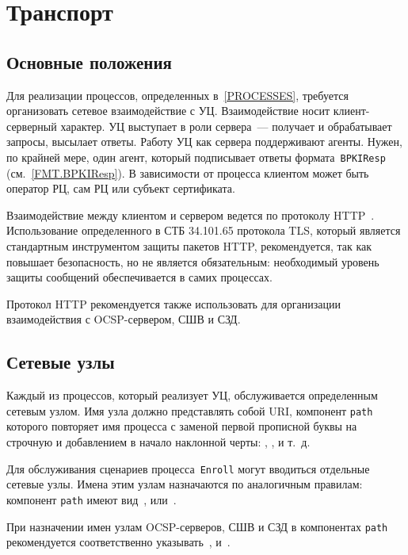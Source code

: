 \chapter{Транспорт}\label{TRANSPORT}

\section{Основные положения}\label{TRANSPORT.Common}

Для реализации процессов, определенных в~\ref{PROCESSES}, 
требуется организовать сетевое взаимодействие с УЦ. Взаимодействие носит 
клиент-серверный характер. 
%
УЦ выступает в роли сервера~--- 
получает и обрабатывает запросы, высылает ответы.
Работу УЦ как сервера поддерживают агенты.
Нужен, по крайней мере, один агент, который подписывает ответы 
формата~\texttt{BPKIResp} (см.~\ref{FMT.BPKIResp}).
%
В зависимости от процесса клиентом может быть оператор РЦ, сам РЦ или 
субъект сертификата. 

Взаимодействие между клиентом и сервером ведется по протоколу HTTP~\cite{HTTP}.
Использование определенного в СТБ 34.101.65 протокола TLS, который 
является стандартным инструментом защиты пакетов HTTP, рекомендуется, 
так как повышает безопасность, но не является обязательным:
необходимый уровень защиты сообщений обеспечивается в самих процессах. 

Протокол HTTP рекомендуется также использовать для организации 
взаимодействия с OCSP-сервером, СШВ и СЗД. 

\section{Сетевые узлы}\label{TRANSPORT.Endpoints}

Каждый из процессов, который реализует УЦ, обслуживается определенным 
сетевым узлом. Имя узла должно представлять собой URI, компонент 
\texttt{path} которого повторяет имя процесса с заменой первой прописной 
буквы на строчную и добавлением в начало наклонной черты: , 
,  и т.~д.

Для обслуживания сценариев процесса~\texttt{Enroll} могут вводиться 
отдельные сетевые узлы. Имена этим узлам назначаются по аналогичным 
правилам: компонент \texttt{path} имеют вид~, 
 или~.

При назначении имен узлам OCSP-серверов, СШВ и СЗД в компонентах  
\texttt{path} рекомендуется соответственно указывать~, 
 и~.

